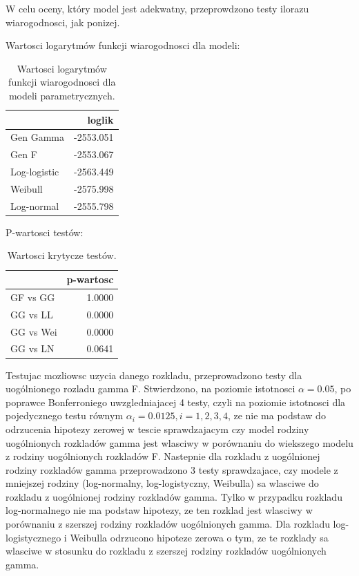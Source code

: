 \documentclass[]{article}
\begin{document}
W celu oceny, który model jest adekwatny, przeprowdzono testy ilorazu
wiarogodnosci, jak ponizej.

Wartosci logarytmów funkcji wiarogodnosci dla modeli:

\begin{table}[hbt!]
\centering
\begin{tabular}{lr}
\toprule%
  & loglik\\ \toprule%

Gen Gamma & -2553.051\\

Gen F & -2553.067\\

Log-logistic & -2563.449\\

Weibull & -2575.998\\

Log-normal & -2555.798\\
\bottomrule
\end{tabular}
\caption{Wartosci logarytmów funkcji wiarogodnosci dla modeli parametrycznych.}
\end{table}

P-wartosci testów:

\begin{table}[hbt!]
\centering
\begin{tabular}{lr}
\toprule%
  & p-wartosc\\
\toprule%
GF vs GG & 1.0000\\

GG vs LL & 0.0000\\

GG vs Wei & 0.0000\\

GG vs LN & 0.0641\\
\bottomrule
\end{tabular}
\caption{Wartosci krytycze testów.}
\end{table}

Testujac mozliowsc uzycia danego rozkladu, przeprowadzono testy dla
uogólnionego rozladu gamma  F. Stwierdzono, na
poziomie istotnosci \(\alpha=0.05\), po poprawce Bonferroniego
uwzgledniajacej 4 testy, czyli na poziomie istotnosci dla pojedycznego
testu równym \(\alpha_i = 0.0125, i =1,2,3,4\), ze nie ma podstaw do
odrzucenia hipotezy zerowej w tescie sprawdzajacym czy model
 rodziny uogólnionych rozkladów gamma jest wlasciwy w
porównaniu do wiekszego modelu z rodziny uogólnionych rozkladów F.
Nastepnie dla rozkladu z uogólnionej rodziny rozkladów gamma
przeprowadzono 3 testy sprawdzajace, czy modele z mniejszej rodziny
(log-normalny, log-logistyczny, Weibulla) sa wlasciwe
 do rozkladu z uogólnionej rodziny rozkladów gamma.
Tylko w przypadku rozkladu log-normalnego nie ma podstaw
 hipotezy, ze ten rozklad jest wlasciwy w porównaniu
 z szerszej rodziny rozkladów uogólnionych gamma. Dla
rozkladu log-logistycznego i Weibulla odrzucono hipoteze zerowa o tym,
ze te rozklady sa wlasciwe w stosunku do rozkladu z szerszej rodziny
rozkladów uogólnionych gamma.
\end{document}
